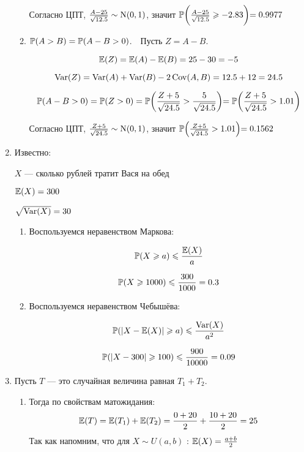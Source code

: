 \begin{enumerate}
\begin{enumerate}
    Согласно ЦПТ, $\frac{A - 25}{\sqrt{12.5}} \sim \cN(0, 1)$, значит $\P\biggl(\frac{A - 25}{\sqrt{12.5}} \ge -2.83\biggl) = 0.9977$
    
    \item $\P(A > B) = \P(A - B > 0)$.~~Пусть $Z = A - B$.
    
    \[\E(Z) = \E(A) - \E(B) = 25 - 30 = -5\] 
    
    \[\Var(Z) = \Var(A) + \Var(B) - 2\Cov(A, B) = 12.5 + 12 = 24.5\] 
    
    \[\P(A - B > 0) = \P(Z > 0) = \P\biggl(\frac{Z + 5}{\sqrt{24.5}} > \frac{5}{\sqrt{24.5}}\biggl) = \P\biggl(\frac{Z + 5}{\sqrt{24.5}} > 1.01\biggl)\]
    
    Согласно ЦПТ, $\frac{Z + 5}{\sqrt{24.5}} \sim \cN(0, 1)$, значит $\P\Bigl(\frac{Z + 5}{\sqrt{24.5}} > 1.01\Bigl) = 0.1562$
\end{enumerate}

\item Известно:

$X$ — сколько рублей тратит Вася на обед

$\E(X) = 300$

$\sqrt{\Var(X)} = 30$


\begin{enumerate}
	\item Воспользуемся неравенством Маркова:
	
	\[
	\P(X \ge a) \le \frac{\E(X)}{a}
	\]
	
	\[
	\P(X \ge 1000) \le \frac{300}{1000} = 0.3
	\]
	
	\item Воспользуемся неравенством Чебышёва:
	
	\[
	\P(|X - \E(X)| \ge a) \le \frac{\Var(X)}{a^{2}}
	\]
	
	\[
	\P(|X - 300| \ge 100) \le \frac{900}{10000} = 0.09
	\]
\end{enumerate}

\item Пусть $T$ — это случайная величина равная $T_{1} + T_{2}$.	
\begin{enumerate}
	\item  
	Тогда по свойствам матожидания:
	\[
	\E(T) = \E(T_{1}) + \E(T_{2}) = \frac{0 + 20}{2} + \frac{10 + 20}{2} = 25
	\]
	Так как напомним, что  для $X\sim U(a, b)$ : $\E(X) = \frac{a + b}{2}$


\end{enumerate}
\end{enumerate}
